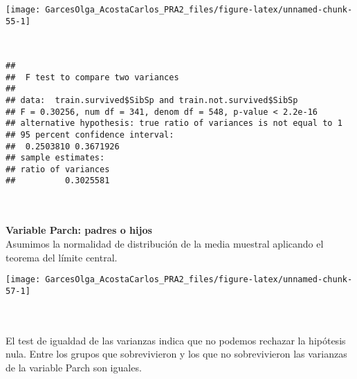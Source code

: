\documentclass[
]{article}
\newenvironment{Shaded}{\begin{snugshade}}{\end{snugshade}}
\newcommand{\KeywordTok}[1]{\textcolor[rgb]{0.13,0.29,0.53}{\textbf{#1}}}
\newcommand{\NormalTok}[1]{#1}
\newcommand{\OperatorTok}[1]{\textcolor[rgb]{0.81,0.36,0.00}{\textbf{#1}}}
\newcommand{\StringTok}[1]{\textcolor[rgb]{0.31,0.60,0.02}{#1}}
\begin{document}
\begin{center}\texttt{[image: GarcesOlga\_AcostaCarlos\_PRA2\_files/figure-latex/unnamed-chunk-55-1]} \end{center}

\texttt{}\\
\texttt{}

\begin{Shaded}
\end{Shaded}

\begin{verbatim}
## 
##  F test to compare two variances
## 
## data:  train.survived$SibSp and train.not.survived$SibSp
## F = 0.30256, num df = 341, denom df = 548, p-value < 2.2e-16
## alternative hypothesis: true ratio of variances is not equal to 1
## 95 percent confidence interval:
##  0.2503810 0.3671926
## sample estimates:
## ratio of variances 
##          0.3025581
\end{verbatim}

\texttt{}~\\
\texttt{}~\\
\textbf{Variable Parch: padres o hijos} \texttt{}\\
Asumimos la normalidad de distribución de la media muestral aplicando el
teorema del límite central.\\
\texttt{}

\begin{Shaded}
\end{Shaded}

\begin{center}\texttt{[image: GarcesOlga\_AcostaCarlos\_PRA2\_files/figure-latex/unnamed-chunk-57-1]} \end{center}

\texttt{}~\\
\texttt{}~\\
El test de igualdad de las varianzas indica que no podemos rechazar la
hipótesis nula. Entre los grupos que sobrevivieron y los que no
sobrevivieron las varianzas de la variable Parch son iguales.\\
\texttt{}
\end{document}
